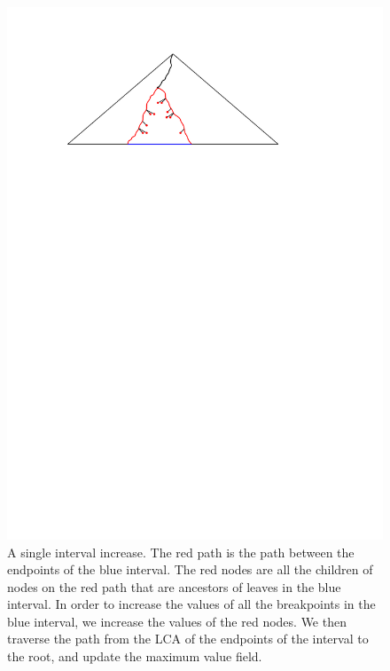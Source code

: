 \documentclass[11pt,a4paper]{article}
\theoremstyle{definition}
\theoremstyle{remark}
\begin{document}
\begin{figure}[h]
\begin{center}
\includegraphics{interval_increase}
\end{center}
\caption{A single interval increase. The red path is the path between the endpoints of the blue interval. The red nodes are all the children of nodes on the red path that are ancestors of leaves in the blue interval. In order to increase the values of all the breakpoints in the blue interval, we increase the values of the red nodes. We then traverse the path from the LCA of the endpoints of the interval to the root, and update the maximum value field.}
\end{figure}
\end{document}
